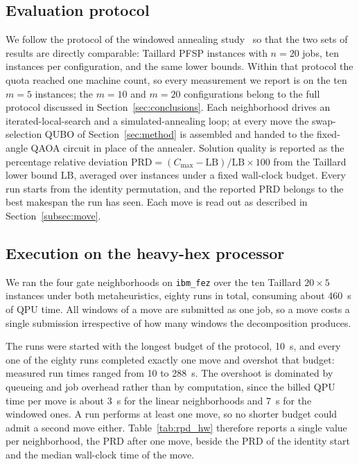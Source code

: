 \documentclass{svproc}
\newcommand{\rev}[1]{{\color{blue}#1}}
\newcommand{\rev}[1]{#1}
\begin{document}
\subsection{Evaluation protocol}
We follow the protocol of the windowed annealing
study~\cite{wojewodzki2026windowed} so that the two sets of results are
directly comparable: Taillard PFSP instances with $n=20$ jobs, ten instances
per configuration, and the same lower bounds. Within that protocol the quota
reached one machine count, so every measurement we report is on the ten $m=5$
instances; the $m=10$ and $m=20$ configurations belong to the full protocol
discussed in Section~\ref{sec:conclusions}. Each
neighborhood drives an iterated-local-search and a simulated-annealing loop; at
every move the swap-selection QUBO of Section~\ref{sec:method} is assembled and
handed to the fixed-angle QAOA circuit in place of the annealer. Solution
quality is reported as the percentage relative deviation
$\mathrm{PRD}=(C_{\max}-\mathrm{LB})/\mathrm{LB}\times100$ from the Taillard
lower bound $\mathrm{LB}$, averaged over instances under a fixed wall-clock
budget. \rev{Every run starts from the identity permutation, and the reported
PRD belongs to the best makespan the run has seen. Each move is read out as
described in Section~\ref{subsec:move}.}

\subsection{Execution on the heavy-hex processor}
\label{subsec:hwresults}
We ran the four gate neighborhoods on \texttt{ibm\_fez} over the ten Taillard
$20\times5$ instances under both metaheuristics, eighty runs in total, consuming
about \rev{460~s} of QPU time. All windows of a move are submitted as one job,
so a move costs a single submission irrespective of how many windows the
decomposition produces.

\rev{The runs were started with the longest budget of the protocol, 10~s, and
every one of the eighty runs completed exactly one move and overshot that
budget: measured run times ranged from 10 to 288~s. The overshoot is dominated
by queueing and job overhead rather than by computation, since the billed QPU
time per move is about 3~s for the linear neighborhoods and 7~s for the
windowed ones. A run performs at least one move, so no shorter budget could
admit a second move either. Table~\ref{tab:rpd_hw} therefore reports a single
value per neighborhood, the PRD after one move, beside the PRD of the identity
start and the median wall-clock time of the move.}
\end{document}
